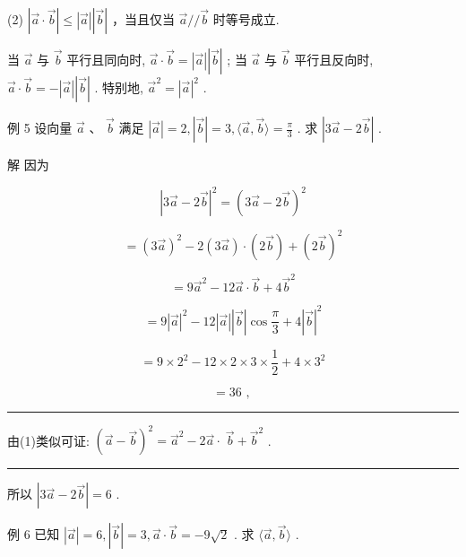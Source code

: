 \documentclass[10pt]{article}
\newcommand{\HRule}{\begin{center}\rule{0.9\linewidth}{0.2mm}\end{center}}
\begin{document}
(2) \(\left| {\overrightarrow{a} \cdot  \overrightarrow{b}}\right|  \leq  \left| \overrightarrow{a}\right| \left| \overrightarrow{b}\right|\) ，当且仅当 \(\overrightarrow{a}//\overrightarrow{b}\) 时等号成立.

当 \(\overrightarrow{a}\) 与 \(\overrightarrow{b}\) 平行且同向时, \(\overrightarrow{a} \cdot  \overrightarrow{b} = \left| \overrightarrow{a}\right| \left| \overrightarrow{b}\right|\) ; 当 \(\overrightarrow{a}\) 与 \(\overrightarrow{b}\) 平行且反向时, \(\overrightarrow{a} \cdot  \overrightarrow{b} =  - \left| \overrightarrow{a}\right| \left| \overrightarrow{b}\right|\) . 特别地, \({\overrightarrow{a}}^{2} = {\left| \overrightarrow{a}\right| }^{2}\) .

例 5 设向量 \(\overrightarrow{a}\text{ 、 }\overrightarrow{b}\) 满足 \(\left| \overrightarrow{a}\right|  = 2,\left| \overrightarrow{b}\right|  = 3,\langle \overrightarrow{a},\overrightarrow{b}\rangle  = \frac{\pi }{3}\) . 求 \(\left| {3\overrightarrow{a} - 2\overrightarrow{b}}\right|\) .

解 因为

\[
{\left| 3\overrightarrow{a} - 2\overrightarrow{b}\right| }^{2} = {\left( 3\overrightarrow{a} - 2\overrightarrow{b}\right) }^{2}
\]

\[
= {\left( 3\overrightarrow{a}\right) }^{2} - 2\left( {3\overrightarrow{a}}\right)  \cdot  \left( {2\overrightarrow{b}}\right)  + {\left( 2\overrightarrow{b}\right) }^{2}
\]

\[
= 9{\overrightarrow{a}}^{2} - {12}\overrightarrow{a} \cdot  \overrightarrow{b} + 4{\overrightarrow{b}}^{2}
\]

\[
= 9{\left| \overrightarrow{a}\right| }^{2} - {12}\left| \overrightarrow{a}\right| \left| \overrightarrow{b}\right| \cos \frac{\pi }{3} + 4{\left| \overrightarrow{b}\right| }^{2}
\]

\[
= 9 \times  {2}^{2} - {12} \times  2 \times  3 \times  \frac{1}{2} + 4 \times  {3}^{2}
\]

\[
= {36}\text{ , }
\]

\HRule

由(1)类似可证: \({\left( \overrightarrow{a} - \overrightarrow{b}\right) }^{2} = {\overrightarrow{a}}^{2} - 2\overrightarrow{a} \cdot \; \overrightarrow{b} + {\overrightarrow{b}}^{2}\) .

\HRule

所以 \(\left| {3\overrightarrow{a} - 2\overrightarrow{b}}\right|  = 6\) .

例 6 已知 \(\left| \overrightarrow{a}\right|  = 6,\left| \overrightarrow{b}\right|  = 3,\overrightarrow{a} \cdot  \overrightarrow{b} =  - 9\sqrt{2}\) . 求 \(\langle \overrightarrow{a},\overrightarrow{b}\rangle\) .
\end{document}
